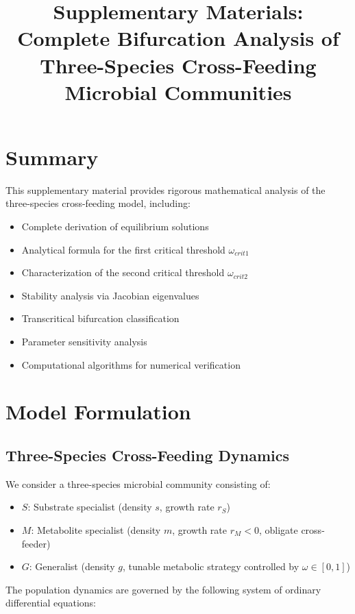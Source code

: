 \documentclass[11pt]{article}
\title{\textbf{Supplementary Materials: Complete Bifurcation Analysis of\\Three-Species Cross-Feeding Microbial Communities}}
\author{}
\date{}
\begin{document}
\maketitle

\section*{Summary}

This supplementary material provides rigorous mathematical analysis of the three-species cross-feeding model, including:
\begin{itemize}
    \item Complete derivation of equilibrium solutions
    \item Analytical formula for the first critical threshold $\omega_{crit1}$
    \item Characterization of the second critical threshold $\omega_{crit2}$
    \item Stability analysis via Jacobian eigenvalues
    \item Transcritical bifurcation classification
    \item Parameter sensitivity analysis
    \item Computational algorithms for numerical verification
\end{itemize}

\tableofcontents

\newpage

\section{Model Formulation}

\subsection{Three-Species Cross-Feeding Dynamics}

We consider a three-species microbial community consisting of:
\begin{itemize}
    \item $S$: Substrate specialist (density $s$, growth rate $r_S$)
    \item $M$: Metabolite specialist (density $m$, growth rate $r_M < 0$, obligate cross-feeder)
    \item $G$: Generalist (density $g$, tunable metabolic strategy controlled by $\omega \in [0,1]$)
\end{itemize}

\noindent The population dynamics are governed by the following system of ordinary differential equations:
\end{document}
